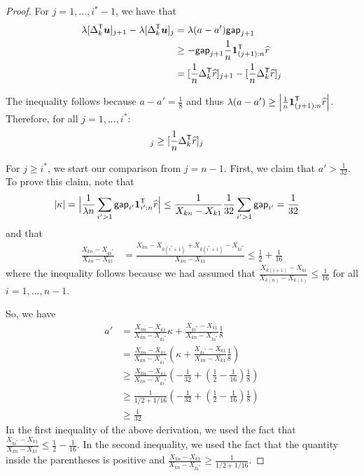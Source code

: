 \begin{proof}
For $j = 1,..., i^*-1$, we have that
\begin{align*}
\lambda [ \Delta_k^{\mathsf{T}} \mbox{\boldmath $u$}]_{j+1} - \lambda [ \Delta_k^{\mathsf{T}} \mbox{\boldmath $u$}]_{j} &= \lambda (a - a') \mathsf{gap}_{j+1} \\
 &\geq -\mathsf{gap}_{j+1} \frac{1}{n} \mbox{\boldmath $1$}_{(j+1):n}^{\mathsf{T}} \widehat{r} \\
& = [ \frac{1}{n} \Delta_k^{\mathsf{T}} \widehat{r} ]_{j+1} - [ \frac{1}{n} \Delta_k^{\mathsf{T}} \widehat{r} ]_{j}
\end{align*}

The inequality follows because $a - a' = \frac{1}{8}$ and thus $\lambda (a - a') \geq \left| \frac{1}{n} \mbox{\boldmath $1$}_{(j+1):n}^{\mathsf{T}} \widehat{r} \right|$. Therefore, for all $j = 1,...,i^*$:
\begin{align*}
[ \lambda \Delta_k^\tran \mathbf{u}]_j &\geq [ \frac{1}{n} \Delta_k^\tran \hat{r} ]_j
\end{align*}

For $j \geq i^*$, we start our comparison from $j=n-1$. First, we claim that $a' > \frac{1}{32}$. To prove this claim, note that
\begin{align}
|\kappa| &= \Big|\frac{1}{\lambda n} \sum_{i' > 1} \mathsf{gap}_{i'} \mbox{\boldmath $1$}_{i':n}^{\mathsf{T}} \widehat{r}\Big| \leq \frac{1}{X_{kn} - X_{k1}}\frac{1}{32} \sum_{i' > 1} \mathsf{gap}_{i'} 
 = \frac{1}{32} 
\end{align}
and that
\begin{align*}
\frac{X_{kn} - X_{ki^*}}{X_{kn} - X_{k1}} &= \frac{X_{kn} - X_{k(i^*+1)} + X_{k(i^*+1)} - X_{ki^*}}{X_{kn} - X_{k1}} \leq \frac{1}{2} + \frac{1}{16}
\end{align*}
where the inequality follows because we had assumed that $\frac{X_{k(i+1)} - X_{ki}}{X_{k(n)} - X_{k(1)}} \leq \frac{1}{16}$ for all $i = 1,...,n-1$.

So, we have 
\begin{align*}
a' &= \frac{X_{kn} - X_{k1}}{X_{kn} - X_{ki^*}} \kappa 
   + \frac{ X_{ki^*} - X_{k1}}{X_{kn} - X_{ki^*}} \frac{1}{8} \\
 &= \frac{X_{kn} - X_{k1}}{X_{kn} - X_{ki^*}} \left(
  \kappa + \frac{X_{ki^*} - X_{k1}}{X_{kn} - X_{k1}} \frac{1}{8} \right) \\
&\geq \frac{X_{kn} - X_{k1}}{X_{kn} - X_{ki^*}} \left(
  -\frac{1}{32} + (\frac{1}{2} - \frac{1}{16}) \frac{1}{8} \right) \\
&\geq \frac{1}{1/2 + 1/16} \left(
  -\frac{1}{32} + (\frac{1}{2} - \frac{1}{16}) \frac{1}{8} \right) \\
&\geq \frac{1}{32}
\end{align*}
In the first inequality of the above derivation, we used the fact that $\frac{X_{ki^*} - X_{k1}}{X_{kn} - X_{k1}} \leq \frac{1}{2} - \frac{1}{16}$. In the second inequality, we used the fact that the quantity inside the parentheses is positive and $\frac{X_{kn} - X_{k1}}{X_{kn} - X_{ki^*}} \geq \frac{1}{1/2 + 1/16}$.


\end{proof}

